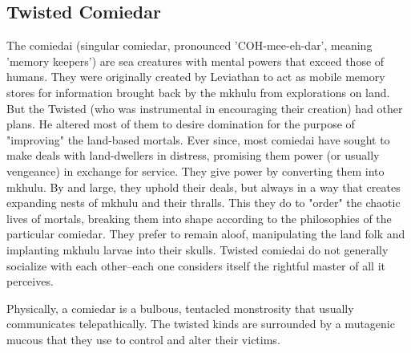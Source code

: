 \FloatBarrier
\subsection{Twisted Comiedar}
The comiedai (singular comiedar, pronounced 'COH-mee-eh-dar', meaning 'memory keepers') are sea creatures with mental powers that exceed those of humans. They were originally created by Leviathan to act as mobile memory stores for information brought back by the mkhulu from explorations on land. But the Twisted (who was instrumental in encouraging their creation) had other plans. He altered most of them to desire domination for the purpose of "improving" the land-based mortals. Ever since, most comiedai have sought to make deals with land-dwellers in distress, promising them power (or usually vengeance) in exchange for service. They give power by converting them into mkhulu. By and large, they uphold their deals, but always in a way that creates expanding nests of mkhulu and their thralls. This they do to "order" the chaotic lives of mortals, breaking them into shape according to the philosophies of the particular comiedar. They prefer to remain aloof, manipulating the land folk and implanting mkhulu larvae into their skulls. Twisted comiedai do not generally socialize with each other--each one considers itself the rightful master of all it perceives.

Physically, a comiedar is a bulbous, tentacled monstrosity that usually communicates telepathically. The twisted kinds are surrounded by a mutagenic mucous that they use to control and alter their victims.

